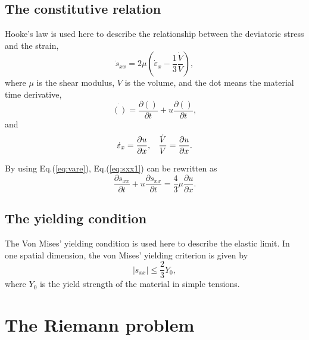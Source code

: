 \documentclass{article}
\numberwithin{equation}{section}
\numberwithin{table}{section}
\begin{document}
\subsection{The constitutive relation}
Hooke's law is used here to describe the relationship between the deviatoric stress and the strain,
\begin{equation}\label{eq:sxx1}
\dot{s}_{xx} = 2\mu \left(\dot{\varepsilon}_x-\frac{1}{3}\frac{\dot{V}}{V}\right),
\end{equation}
where $\mu$ is the shear modulus, $V$ is the volume, and the dot means the material time derivative,
\begin{equation}\label{eq:mt}
  \dot{()} = \frac{\partial ()}{\partial t} + u \frac{\partial ()}{\partial t},
\end{equation}
and
\begin{equation}\label{eq:vare}
  \dot{\varepsilon}_x = \frac{\partial u}{\partial x}, \hspace{0.3cm} \frac{\dot{V}}{V} = \frac{\partial u}{\partial x}.
\end{equation}

By using Eq.(\ref{eq:vare}), Eq.(\ref{eq:sxx1}) can be rewritten as
\begin{equation}\label{eq:sxx}
  \frac{\partial s_{xx}}{\partial t} + u \frac{\partial s_{xx}}{\partial t} =\frac{4}{3}\mu \frac{\partial u}{\partial x}.
\end{equation}

\subsection{The yielding condition}
The Von Mises' yielding condition is used here to describe the elastic limit. In one spatial dimension, the von Mises' yielding criterion is given by
\begin{equation}
  |s_{xx}| \le \frac{2}{3}Y_0,
\end{equation}
where $Y_0$ is the yield strength of the material in  simple tensions.

\section{The Riemann problem}\label{sec:Riemann}
\end{document}
